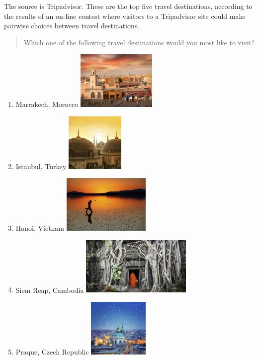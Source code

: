 
The source is Tripadvisor.
These are the top five travel destinations, according to the results of an on-line contest where visitors to a Tripadvisor site could make pairwise choices between travel destinations.

\begin{tcolorbox}
\begin{quotation}
Which one of the following travel destinations would you most like to visit?
\end{quotation}

\begin{enumerate}
\item Marrakech, Morocco
\includegraphics[height=2.8cm]{Population_study_design/Travel1.jpg}

\item Istanbul, Turkey
\includegraphics[height=2.8cm]{Population_study_design/Travel2.jpg}

\item Hanoi, Vietnam
\includegraphics[height=2.8cm]{Population_study_design/Travel3.jpg}

\item Siem Reap, Cambodia
\includegraphics[height=2.8cm]{Population_study_design/Travel4.jpg}

\item Praque, Czech Republic
\includegraphics[height=2.8cm]{Population_study_design/Travel5.jpg}
\end{enumerate}	
\end{tcolorbox}
